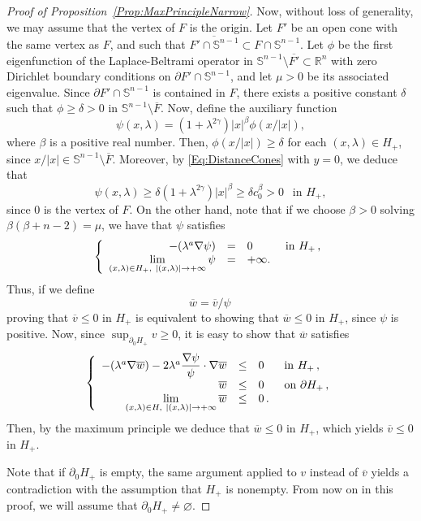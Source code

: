\documentclass[12pt,reqno]{amsart}
\theoremstyle{definition}
\theoremstyle{remark}
\newcommand{\con}[1]{\mathbb{#1}}
\newcommand{\R}{\con{R}} %
\newcommand{\Sph}{\con{S}} %
\newcommand{\s}{\gamma}
\newcommand\beqc[1]{\left\{\begin{array}{#1}}
\newcommand\eeqc{\end{array} \right.}
\def\PDEsystem{rcll}
\let\div\relax
\DeclareMathOperator{\div}{div}
\def\ds{\displaystyle}
\numberwithin{equation}{section}
\begin{document}
\begin{proof}[Proof of Proposition~\ref{Prop:MaxPrincipleNarrow}]
Now, without loss of generality, we may assume that the vertex of $F$ is the origin. Let $F'$ be an open cone with the same vertex as $F$, and such that $\overline{F'\cap \Sph^{n-1}} \subset F\cap \Sph^{n-1}$. Let $\phi$ be the first eigenfunction of the Laplace-Beltrami operator in $\Sph^{n-1} \setminus \overline{F'}\subset \R^n$ with zero Dirichlet boundary conditions on $\partial F' \cap \Sph^{n-1}$, and let $\mu>0$ be its associated eigenvalue. Since $\partial F' \cap \Sph^{n-1}$ is contained in $F$, there exists a positive constant $\delta$ such that $\phi\geq \delta > 0$ in $\Sph^{n-1} \setminus \overline{F}$. Now, define the auxiliary function
$$ 
\psi(x,\lambda) = (1+\lambda^{2\s}) |x|^\beta \phi(x/|x|), 
$$
where $\beta$ is a positive real number. Then, $\phi(x/|x|)\geq \delta$ for each $(x,\lambda) \in H_+$,  since $x/|x| \in \Sph^{n-1} \setminus \overline{F}$. Moreover, by \eqref{Eq:DistanceCones} with $y=0$, we deduce that
$$ 
\psi(x,\lambda) \geq \delta (1+\lambda^{2\s}) |x|^\beta \geq \delta c_0^\beta > 0 \ \ \text{ in } H_+,
$$
since $0$ is the vertex of $F$.
On the other hand, note that if we choose $\beta>0$ solving $\beta(\beta+n-2)=\mu$, we have that $\psi$ satisfies
$$
\beqc{\PDEsystem}
-\div(\lambda^a \nabla \psi) &=& 0 & \text{ in } H_+\,, \\
\ds \lim_{(x,\lambda)\in H_+, \ |(x,\lambda)|\to +\infty} \psi & = & +\infty.
\eeqc
$$
Thus, if we define 
$$\overline{w}=\overline{v}/\psi\,$$
proving that $\overline{v} \leq 0$ in $H_+$ is equivalent to showing that $\overline{w}\leq 0$ in $H_+$, since $\psi$ is positive. Now, since $\sup_{\partial_0 H_+} v \geq 0$, it is easy to show that $\overline{w}$ satisfies
\begin{equation}
\label{Eq:wTildeEquationNarrow}
\beqc{\PDEsystem}
-\div(\lambda^a \nabla \overline{w})-2\lambda^a\dfrac{\nabla \psi}{\psi}\cdot\nabla \overline{w} &\leq& 0 & \text{ in } H_+\,, \\
\overline{w} &\leq& 0 & \text{ on } \partial H_+\,, \\
\ds \lim_{(x,\lambda)\in H, \ |(x,\lambda)|\to +\infty} \overline{w} & \leq & 0\,.
\eeqc
\end{equation}
Then, by the maximum principle we deduce that $\overline{w}\leq 0$ in $H_+$, which yields $\overline{v}\leq 0$ in $H_+$.

Note that if $\partial_0 H_+$ is empty, the same argument applied to $v$ instead of $\overline{v}$ yields a contradiction with the assumption that $H_+$ is nonempty. From now on in this proof, we will assume that $\partial_0 H_+ \neq \varnothing$.


\end{proof}
\end{document}
